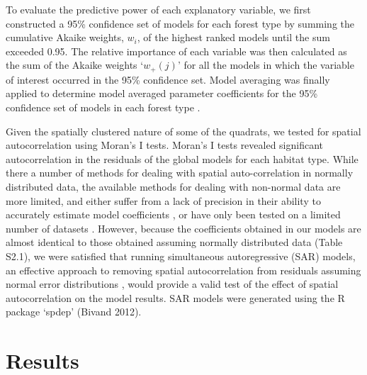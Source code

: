 To evaluate the predictive power of each explanatory variable, we first constructed a 95\% confidence set of models for each forest type by summing the cumulative Akaike weights, $w_{i}$, of the highest ranked models until the sum exceeded 0.95. The relative importance of each variable was then calculated as the sum of the Akaike weights `$w_{+}(j)$' for all the models in which the variable of interest occurred in the 95\% confidence set. Model averaging was finally applied to determine model averaged parameter coefficients for the 95\% confidence set of models in each forest type \citep{Burn}.


Given the spatially clustered nature of some of the quadrats, we tested for spatial autocorrelation using Moran's I tests. Moran's I tests revealed significant autocorrelation in the residuals of the global models for each habitat type. While there a number of methods for dealing with spatial auto-correlation in normally distributed data, the available methods for dealing with non-normal data are more limited, and either suffer from a lack of precision in their ability to accurately estimate model coefficients \citep{Dormann2007}, or have only been tested on a limited number of datasets \citep{Murphy2010}. However, because the coefficients obtained in our models are almost identical to those obtained assuming normally distributed data (Table S2.1), we were satisfied that running simultaneous autoregressive (SAR) models, an effective approach to removing spatial autocorrelation from residuals assuming normal error distributions \citep{Kissling2007}, would provide a valid test of the effect of spatial autocorrelation on the model results. SAR models were generated using the R package `spdep' (Bivand 2012).

\section{Results}

